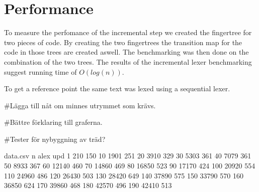 \section{Performance}
To measure the perfomance of the incremental step we created the fingertree for
two pieces of code. By creating the two fingertrees the transition map for the
code in those trees are created aswell. The benchmarking was then done on the
combination of the two trees. The results of the incremental lexer benchmarking
suggest running time of $O(log(n))$.

To get a reference point the same text was lexed using a sequential lexer.

\#Lägga till nåt om minnes utrymmet som krävs.

\#Bättre förklaring till graferna.

\#Tester för nybyggning av träd?

\begin{filecontents*}{data.csv}
n    alex   upd
1    210    150
10   1901   251
20   3910   329
30   5303   361
40   7079   361
50   8933   367
60   12140  460
70   14860  469
80   16850  523
90   17170  424
100  20920  554
110  24960  486
120  26430  503
130  28420  649
140  37890  575
150  33790  570
160  36850  624
170  39860  468
180  42570  496
190  42410  513
\end{filecontents*}
\\
\\
